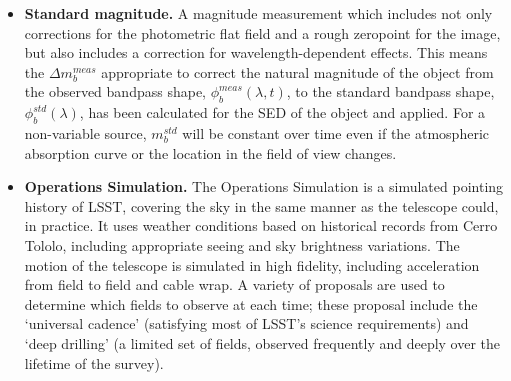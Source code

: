 \documentclass[12pt,preprint]{aastex}
\begin{document}
\begin{itemize}
\item{{\bf Standard magnitude.} A magnitude measurement which includes
  not only corrections for the photometric flat field and a rough
  zeropoint for the image, but also includes a correction for
  wavelength-dependent effects. This means the $\Delta m_b^{meas}$
  appropriate to correct the natural magnitude of the object from the
  observed bandpass shape,  $\phi_b^{meas}(\lambda,t)$, to the
  standard bandpass shape, $\phi_b^{std}(\lambda)$, has been
  calculated for the SED of the object and applied.  For a
  non-variable source, $m_b^{std}$ will be constant over time even if
  the atmospheric absorption curve or the location in the field of
  view changes.}

\item{{\bf Operations Simulation.} The Operations Simulation is a
simulated pointing history of LSST, covering the sky in the same
manner as the telescope could, in practice. It uses weather conditions
based on historical records from Cerro Tololo, including appropriate
seeing and sky brightness variations. The motion of the telescope is
simulated in high fidelity, including acceleration from field to field
and cable wrap.  A variety of proposals are used to determine which
fields to observe at each time; these proposal include the `universal
cadence' (satisfying most of LSST's science requirements) and `deep
drilling' (a limited set of fields, observed frequently and deeply
over the lifetime of the survey). }

\end{itemize}
\end{document}
